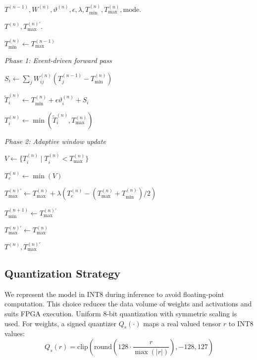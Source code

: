 \documentclass[12pt]{article}
\begin{document}
\begin{algorithm}[H]
\caption{Forward Pass and Adaptive Temporal Window Update}
\label{alg:atsnn_update}
\begin{algorithmic}[1]

\Require
$T^{(n-1)}, W^{(n)}, \vartheta^{(n)}, \epsilon, \lambda,
T_{\min}^{(n)}, T_{\max}^{(n)}, \text{mode}$.

\Ensure
$T^{(n)}, T_{\max}^{(n)\prime}$.

\State
$T_{\min}^{(n)} \gets T_{\max}^{(n-1)}$

\Statex
\textit{Phase 1: Event-driven forward pass}


\State
$S_i \gets
\sum_j W_{ij}^{(n)}
(T_j^{(n-1)} - T_{\min}^{(n)})$

\State
$\tilde{T}_i^{(n)}
\gets
T_{\min}^{(n)}
+
\epsilon \vartheta_i^{(n)}
+
S_i$

\State
$T_i^{(n)}
\gets
\min(\tilde{T}_i^{(n)}, T_{\max}^{(n)})$

\EndFor

\Statex
\textit{Phase 2: Adaptive window update}


\State
$V \gets
\{T_i^{(n)} \mid T_i^{(n)} < T_{\max}^{(n)}\}$


\State
$T_e^{(n)} \gets \min(V)$

\State
$T_{\max}^{(n)\prime}
\gets
T_{\max}^{(n)}
+
\lambda
\left(
T_e^{(n)}
-
(T_{\max}^{(n)} + T_{\min}^{(n)})/2
\right)$

\EndIf

\State
$T_{\min}^{(n+1)} \gets T_{\max}^{(n)\prime}$

\Else

\State
$T_{\max}^{(n)\prime} \gets T_{\max}^{(n)}$

\EndIf

\State
\Return $T^{(n)}, T_{\max}^{(n)\prime}$

\end{algorithmic}
\end{algorithm}


\subsection{Quantization Strategy}
We represent the model in INT8 during inference to avoid floating-point computation. This choice reduces the data volume of weights and activations and suits FPGA execution. Uniform 8-bit quantization with symmetric scaling is used. For weights, a signed quantizer $Q_s(\cdot)$ maps a real valued tensor $r$ to INT8 values:
\begin{equation}
Q_s(r)=\mathrm{clip}\!\left(
\mathrm{round}\!\left(
128\cdot \frac{r}{\max(|r|)}
\right), -128, 127
\right)
\label{eq:quant_w}
\end{equation}
\end{document}
